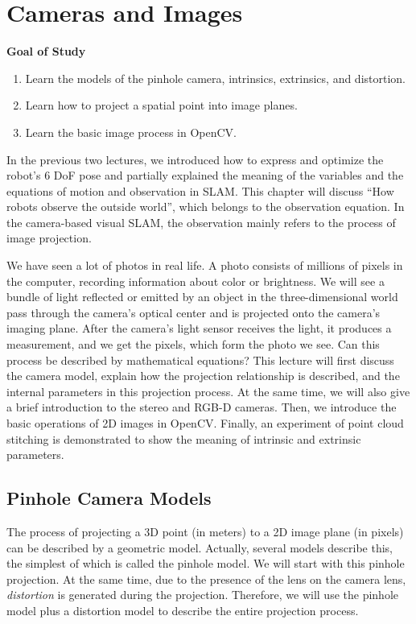 \chapter{Cameras and Images}
\label{cpt:5}
\begin{mdframed}  
	\textbf{Goal of Study}
	\begin{enumerate}[labelindent=0em,leftmargin=1.5em]
		\item Learn the models of the pinhole camera, intrinsics, extrinsics, and distortion. 
		\item Learn how to project a spatial point into image planes. 
		\item Learn the basic image process in OpenCV. 
	\end{enumerate}
\end{mdframed} 

In the previous two lectures, we introduced how to express and optimize the robot's 6 DoF pose and partially explained the meaning of the variables and the equations of motion and observation in SLAM. This chapter will discuss ``How robots observe the outside world'', which belongs to the observation equation. In the camera-based visual SLAM, the observation mainly refers to the process of image projection.

We have seen a lot of photos in real life. A photo consists of millions of pixels in the computer, recording information about color or brightness. We will see a bundle of light reflected or emitted by an object in the three-dimensional world pass through the camera's optical center and is projected onto the camera's imaging plane. After the camera's light sensor receives the light, it produces a measurement, and we get the pixels, which form the photo we see. Can this process be described by mathematical equations? This lecture will first discuss the camera model, explain how the projection relationship is described, and the internal parameters in this projection process. At the same time, we will also give a brief introduction to the stereo and RGB-D cameras. Then, we introduce the basic operations of 2D images in OpenCV. Finally, an experiment of point cloud stitching is demonstrated to show the meaning of intrinsic and extrinsic parameters.

\newpage

\newpage
\section{Pinhole Camera Models}
The process of projecting a 3D point (in meters) to a 2D image plane (in pixels) can be described by a geometric model. Actually, several models describe this, the simplest of which is called the pinhole model. We will start with this pinhole projection. At the same time, due to the presence of the lens on the camera lens, \textit{distortion} is generated during the projection. Therefore, we will use the pinhole model plus a distortion model to describe the entire projection process.

